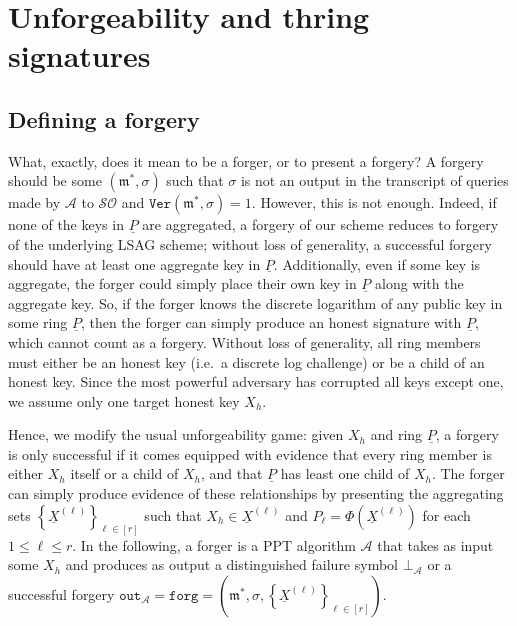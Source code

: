 \documentclass{mrl}
\theoremstyle{definition}
\numberwithin{theorem}{subsection}
\newcommand{\adversary}{\mathcal{A}}
\newcommand{\m}{\mathfrak{m}}
\begin{document}




\section{Unforgeability and thring signatures}\label{unf}


\subsection{Defining a forgery}

What, exactly, does it mean to be a forger, or to present a forgery? A forgery should be some $(\m^*, \sigma)$ such that $\sigma$ is not an output in the transcript of queries made by $\adversary$ to $\mathcal{SO}$ and $\texttt{Ver}(\m^*, \sigma)=1$. However, this is not enough. Indeed, if none of the keys in $\underline{P}$ are aggregated, a forgery of our scheme reduces to forgery of the underlying LSAG scheme; without loss of generality, a successful forgery should have at least one aggregate key in $\underline{P}$. Additionally, even if some key is aggregate, the forger could simply place their own key in $\underline{P}$ along with the aggregate key. So, if the forger knows the discrete logarithm of any public key in some ring $\underline{P}$, then the forger can simply produce an honest signature with $\underline{P}$, which cannot count as a forgery. Without loss of generality, all ring members must either be an honest key (i.e.\ a discrete log challenge) or be a child of an honest key. Since the most powerful adversary has corrupted all keys except one, we assume only one target honest key $X_h$. 

Hence, we modify the usual unforgeability game: given $X_h$ and ring $\underline{P}$, a forgery is only successful if it comes equipped with evidence that every ring member is either $X_h$ itself or a child of $X_h$, and that $\underline{P}$ has least one child of $X_h$.  The forger can simply produce evidence of these relationships by presenting the aggregating sets $\left\{\underline{X}^{(\ell)}\right\}_{\ell \in [r]}$ such that $X_h \in \underline{X}^{(\ell)}$ and $P_\ell = \Phi(\underline{X}^{(\ell)})$ for each $1 \leq \ell \leq r$. In the following, a forger is a PPT algorithm $\adversary$ that takes as input some $X_h$ and produces as output a distinguished failure symbol $\bot_\adversary$ or a successful forgery $\texttt{out}_{\adversary} = \texttt{forg} = (\m^*, \sigma, \left\{\underline{X}^{(\ell)}\right\}_{\ell \in [r]})$.
\end{document}
